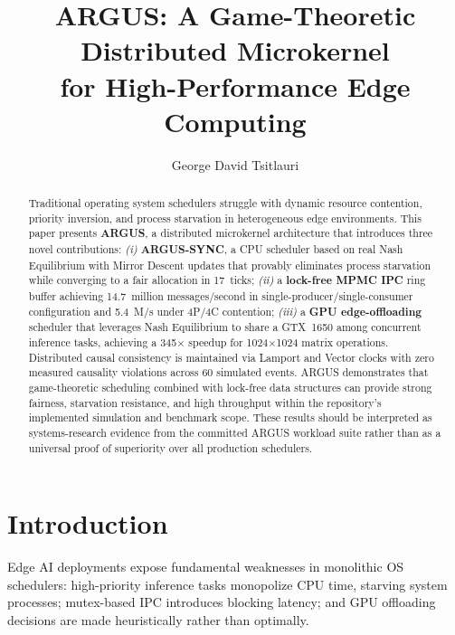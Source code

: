 \documentclass[sigconf]{acmart}
\begin{document}
\title{ARGUS: A Game-Theoretic Distributed Microkernel\\for High-Performance Edge Computing}

\author{George David Tsitlauri}

\begin{abstract}
Traditional operating system schedulers struggle with dynamic resource
contention, priority inversion, and process starvation in heterogeneous
edge environments.  This paper presents \textbf{ARGUS}, a distributed
microkernel architecture that introduces three novel contributions:
\emph{(i)} \textbf{ARGUS-SYNC}, a CPU scheduler based on real Nash
Equilibrium with Mirror Descent updates that provably eliminates process
starvation while converging to a fair allocation in 17~ticks;
\emph{(ii)} a \textbf{lock-free MPMC IPC} ring buffer achieving
14.7~million messages/second in single-producer/single-consumer
configuration and 5.4~M/s under 4P/4C contention;
\emph{(iii)} a \textbf{GPU edge-offloading} scheduler that leverages
Nash Equilibrium to share a GTX~1650 among concurrent inference tasks,
achieving a 345$\times$ speedup for 1024$\times$1024 matrix operations.
Distributed causal consistency is maintained via Lamport and Vector clocks
with zero measured causality violations across $60$ simulated events.
ARGUS demonstrates that game-theoretic scheduling combined with lock-free
data structures can provide strong fairness, starvation resistance, and high
throughput within the repository's implemented simulation and benchmark scope.
These results should be interpreted as systems-research evidence from the
committed ARGUS workload suite rather than as a universal proof of superiority
over all production schedulers.
\end{abstract}

\maketitle

\section{Introduction}

Edge AI deployments expose fundamental weaknesses in monolithic OS schedulers:
high-priority inference tasks monopolize CPU time, starving system processes;
mutex-based IPC introduces blocking latency; and GPU offloading decisions are
made heuristically rather than optimally.
\end{document}

